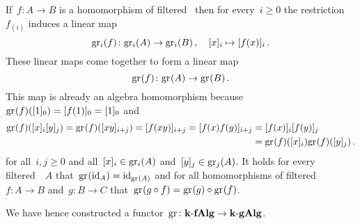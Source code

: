 \begin{construction}
  If~$f \colon A \to B$ is a homomorphism of filtered~{\algebras{$\kf$}} then for every~$i \geq 0$ the restriction~$f_{(i)}$ induces a linear map
  \[
    \gr[i](f)
    \colon
    \gr[i](A)
    \to
    \gr[i](B) \,,
    \quad
    [x]_i
    \mapsto
    [f(x)]_i  \,.
  \]
  These linear maps come together to form a linear map
  \[
    \gr(f)
    \colon
    \gr(A)
    \to
    \gr(B)  \,.
  \]
  This map is already an algebra homomorphism because~$\gr(f)([1]_0) = [f(1)]_0 = [1]_0$ and
  \begin{align*}
    \gr(f)( [x]_i [y]_j )
    =
    \gr(f)( [xy]_{i+j} )
    =
    [f(xy)]_{i+j}
    =
    [f(x) f(y)]_{i+j}
    &=
    [f(x)]_i [f(y)]_j
    \\
    &=
    \gr(f)([x]_i) \gr(f)([y]_j) \,.
  \end{align*}
  for all~$i, j \geq 0$ and all~$[x]_i \in \gr[i](A)$ and~$[y]_j \in \gr[j](A)$.  
  It holds for every filtered~{\algebra{$\kf$}}~$A$ that~$\gr(\id_A) = \id_{\gr(A)}$ and for all homomorphisms of filtered~{\algebras{$\kf$}}~$f \colon A \to B$ and~$g \colon B \to C$ that~$\gr(g \circ f) = \gr(g) \circ \gr(f)$.
  
  We have hence constructed a functor~$\gr \colon \cfAlg{\kf} \to \cgAlg{\kf}$.
\end{construction}



% 
% 
% 

